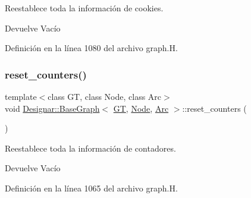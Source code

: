 Reestablece toda la información de cookies. 

\begin{DoxyReturn}{Devuelve}
Vacío 
\end{DoxyReturn}


Definición en la línea 1080 del archivo graph.\+H.

\mbox{\label{class_designar_1_1_base_graph_a881c342d8f25d43f995ccfdf876622e1}} 
\subsubsection{\texorpdfstring{reset\+\_\+counters()}{reset\_counters()}}
{\footnotesize\ttfamily template$<$class GT, class Node, class Arc$>$ \\
void \hyperlink{class_designar_1_1_base_graph}{Designar\+::\+Base\+Graph}$<$ \hyperlink{demo-buildgraph_8_c_a3001c40d2c31ca87ed96cd7d1334a55e}{GT}, \hyperlink{namespace_designar_a5af326c65aa2bd26b26c410f2030d09e}{Node}, \hyperlink{namespace_designar_a3f55fb5513d62ff47cbc8f72b8e95d6f}{Arc} $>$\+::reset\+\_\+counters (\begin{DoxyParamCaption}{ }\end{DoxyParamCaption})\hspace{0.3cm}{\ttfamily [inline]}}



Reestablece toda la información de contadores. 

\begin{DoxyReturn}{Devuelve}
Vacío 
\end{DoxyReturn}


Definición en la línea 1065 del archivo graph.\+H.

\mbox{\label{class_designar_1_1_base_graph_ab797f80e7efa5a6d0b33f925d6079c18}} 

